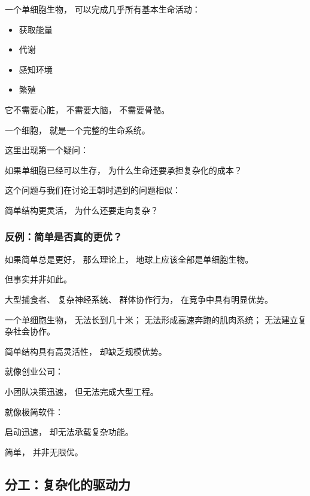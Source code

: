 \documentclass[../main.tex]{subfiles}
\begin{document}
一个单细胞生物，
可以完成几乎所有基本生命活动：

\begin{itemize}
	\item 获取能量
	\item 代谢
	\item 感知环境
	\item 繁殖
\end{itemize}

它不需要心脏，
不需要大脑，
不需要骨骼。

\begin{readingnote}
	一个细胞，
	就是一个完整的生命系统。
\end{readingnote}

这里出现第一个疑问：

\begin{questionbox}
	如果单细胞已经可以生存，
	为什么生命还要承担复杂化的成本？
\end{questionbox}

这个问题与我们在讨论王朝时遇到的问题相似：

简单结构更灵活，
为什么还要走向复杂？

\subsubsection{反例：简单是否真的更优？}

如果简单总是更好，
那么理论上，
地球上应该全部是单细胞生物。

但事实并非如此。

大型捕食者、
复杂神经系统、
群体协作行为，
在竞争中具有明显优势。

\begin{examplebox}
	一个单细胞生物，
	无法长到几十米；
	无法形成高速奔跑的肌肉系统；
	无法建立复杂社会协作。
\end{examplebox}

简单结构具有高灵活性，
却缺乏规模优势。

就像创业公司：

小团队决策迅速，
但无法完成大型工程。

就像极简软件：

启动迅速，
却无法承载复杂功能。

简单，
并非无限优。

\subsection{分工：复杂化的驱动力}
\end{document}
